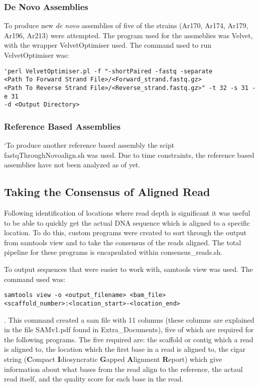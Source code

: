 \documentclass[../main.tex]{subfiles}
\begin{document}
	\subsubsection{De Novo Assemblies}
	To produce new \textit{de novo} assemblies of five of the strains (Ar170, Ar174, Ar179, Ar196, Ar213) were attempted. The program used for the assmeblies was Velvet, with the wrapper VelvetOptimiser used. The command used to run VelvetOptimiser was: 
\begin{verbatim}
'perl VelvetOptimiser.pl -f "-shortPaired -fastq -separate 
<Path To Forward Strand File>/<Forward_strand.fastq.gz> 
<Path To Reverse Strand File>/<Reverse_strand.fastq.gz>" -t 32 -s 31 -e 31 
-d <Output Directory>
\end{verbatim}

	\subsubsection{Reference Based Assemblies}
	`To produce another reference based assembly the scipt fastqThroughNovoalign.sh was used. Due to time constraints, the reference based assemblies have not been analyzed as of yet.

\subsection{Taking the Consensus of Aligned Read}
	Following identification of locations where read depth is significant it was useful to be able to quickly get the actual DNA sequence which is aligned to a specific location. To do this, custom programs were created to sort through the output from samtools view and to take the consensus of the reads aligned. The total pipeline for these programs is encapsulated within consensus\_reads.sh.
	
	To output sequences that were easier to work with, samtools view was used. The command used was: \begin{verbatim}samtools view -o <output_filename> <bam_file> 
<scaffold_number>:<location_start>-<location_end>\end{verbatim} . This command created a sam file with 11 columns (these columns are explained in the file SAMv1.pdf found in Extra_Documents), five of which are required for the following programs. The five required are: the scaffold or contig which a read is aligned to, the location which the first base in a read is aligned to, the cigar string (\textbf{C}ompact \textbf{I}diosyncratic \textbf{G}apped \textbf{A}lignment \textbf{R}eport) which give information about what bases from the read align to the reference, the actaul read itself, and the quality score for each base in the read. 
\end{document}

